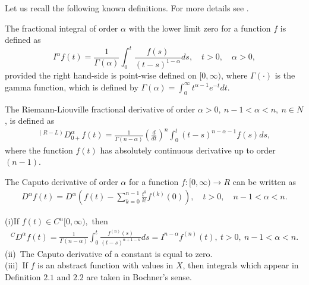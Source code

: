 \documentclass[11pt]{article}
\def \ra{\rightarrow}
\begin{document}
Let us recall the following known definitions. For more details see \cite{kil,bal1}.
\begin{definition}
The fractional integral of order $\alpha$ with the lower limit zero for a function $f$ is defined as
$$I^{\alpha} f(t)= \frac{1}{\Gamma(\alpha)}\int_0^t\frac{f(s)}{(t-s)^{1-\alpha}}ds,\quad t>0,\quad \alpha>0, $$
provided the right hand-side is point-wise defined on $[0,\infty)$, where $\Gamma(\cdot)$ is the gamma function, which is defined by $\Gamma(\alpha)=\int_{0}^{\infty}t^{\alpha-1}e^{-t}dt.$
\end{definition}


\begin{definition}
The Riemann-Liouville  fractional derivative  of order $ \alpha>0,\ n-1<\alpha<n,\ n\in N$, is defined as
\begin{gather*}
^{(R-L)}D_{0+}^{\alpha}f(t)=\frac{1}{\Gamma(n-\alpha)}\left(\frac{d}{dt}\right)^n\int_0^t (t-s)^{n-\alpha-1}f(s)ds,
\end{gather*}
where the function $f(t)$ has absolutely continuous derivative up to order $(n-1)$.
\end{definition}

\begin{definition}
The Caputo derivative of order $\alpha$ for a function $f:[0,\infty)\ra R$ can be written as 
\begin{align*}
D^\alpha f(t)= D^\alpha\left(f(t)-\sum_{k=0}^{n-1}\frac{t^k}{k!}f^{(k)}(0)\right),\quad t>0, \quad n-1<\alpha<n.
\end{align*}
\end{definition}


\begin{remark}
(i)If $f(t)\in C^{n}[0,\infty),$ then
\begin{gather*}
^CD^{\alpha}f(t)= \frac{1}{\Gamma(n-\alpha)}\int_0^t \frac{f^{(n)}(s)}{(t-s)^{\alpha+1-n}}ds = I^{n-\alpha}f^{(n)}(t),\ t>0,\ n-1<\alpha<n.
\end{gather*}
(ii)\ The Caputo derivative of a constant is equal to zero.\\
(iii)\ If $f$ is an abstract function with values in $X$, then integrals which appear in Definition $2.1$ and $2.2$ are taken in Bochner's sense.
\end{remark}
\end{document}
